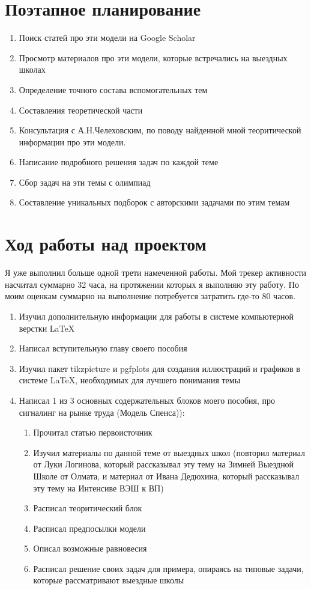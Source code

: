 \section{Поэтапное планирование}
\begin{enumerate}
    \item Поиск статей про эти модели на Google Scholar
    \item Просмотр материалов про эти модели, которые встречались на выездных школах
    \item Определение точного состава вспомогательных тем
    \item Составления теоретической части
    \item Консультация с А.Н.Челеховским, по поводу найденной мной теоритической информации про эти модели.
    \item Написание подробного решения задач по каждой теме
    \item Сбор задач на эти темы с олимпиад
    \item Составление уникальных подборок с авторскими задачами по этим темам
\end{enumerate}

\section{Ход работы над проектом}
Я уже выполнил больше одной трети намеченной работы. Мой трекер активности насчитал суммарно 32 часа, на протяжении
которых я выполняю эту работу. По моим оценкам суммарно на выполнение потребуется затратить где-то 80 часов.
\begin{enumerate}
    \item Изучил дополнительную информации для работы в системе компьютерной верстки LaTeX
    \item Написал вступительную главу своего пособия
    \item Изучил пакет tikzpicture и pgfplots для создания иллюстраций и графиков в системе LaTeX, необходимых для 
    лучшего понимания темы
    \item Написал 1 из 3 основных содержательных блоков моего пособия, про сигналинг на рынке труда (Модель Спенса)):
    \begin{enumerate}
        \item Прочитал статью первоисточник
        \item Изучил материалы по данной теме от выездных школ (повторил материал от Луки Логинова, который
        рассказывал эту тему на Зимней Выездной Школе от Олмата, и материал от Ивана Дедюхина, который рассказывал
        эту тему на Интенсиве ВЭШ к ВП)
        \item Расписал теоритический блок
        \item Расписал предпосылки модели
        \item Описал возможные равновесия
        \item Расписал решение своих задач для примера, опираясь на типовые задачи, которые рассматривают выездные школы
    \end{enumerate}
\end{enumerate}

